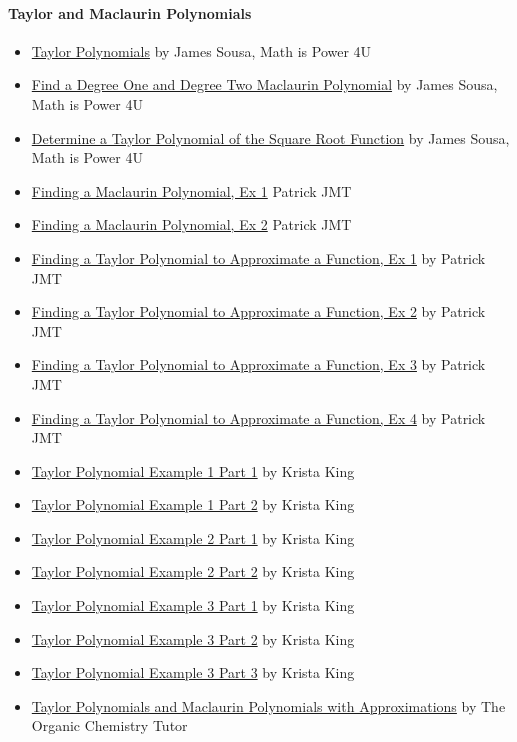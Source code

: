 \paragraph{Taylor and Maclaurin Polynomials}



\begin{itemize}
    \item \href{https://www.youtube.com/watch?v=lShzrGyiueg}{Taylor Polynomials} by James Sousa, Math is Power 4U
    \item \href{https://www.youtube.com/watch?v=SC6TsVsP90U}{Find a Degree One and Degree Two Maclaurin Polynomial} by James Sousa, Math is Power 4U
    \item \href{https://www.youtube.com/watch?v=39s-mgfuuno}{Determine a Taylor Polynomial of the Square Root Function} by James Sousa, Math is Power 4U
    \item \href{https://www.youtube.com/watch?v=6eNE38s9Fv0}{Finding a Maclaurin Polynomial, Ex 1} Patrick JMT
    \item \href{https://www.youtube.com/watch?v=tYl7tXKKkSw}{Finding a Maclaurin Polynomial, Ex 2} Patrick JMT
    \item \href{https://www.youtube.com/watch?v=WKvBJdl1qrM}{Finding a Taylor Polynomial to Approximate a Function, Ex 1} by Patrick JMT
    \item \href{https://www.youtube.com/watch?v=w_oDLT5VnBI}{Finding a Taylor Polynomial to Approximate a Function, Ex 2} by Patrick JMT
    \item \href{https://www.youtube.com/watch?v=UINFWG0ErSA}{Finding a Taylor Polynomial to Approximate a Function, Ex 3} by Patrick JMT
    \item \href{https://www.youtube.com/watch?v=em4YU8rUhco}{Finding a Taylor Polynomial to Approximate a Function, Ex 4} by Patrick JMT
    \item \href{https://www.youtube.com/watch?v=C1vcVMotnkg}{Taylor Polynomial Example 1 Part 1} by Krista King
    \item \href{https://www.youtube.com/watch?v=JMU-4o-Ffus}{Taylor Polynomial Example 1 Part 2} by Krista King
    \item \href{https://www.youtube.com/watch?v=h2EGCv0PyZ8}{Taylor Polynomial Example 2 Part 1} by Krista King
    \item \href{https://www.youtube.com/watch?v=Fw9u5h4MoJo}{Taylor Polynomial Example 2 Part 2} by Krista King
    \item \href{https://www.youtube.com/watch?v=kd5nuHkKsr4}{Taylor Polynomial Example 3 Part 1} by Krista King
    \item \href{https://www.youtube.com/watch?v=l5eqQFfMp-0}{Taylor Polynomial Example 3 Part 2} by Krista King
    \item \href{https://www.youtube.com/watch?v=NWl-dwL7_Do}{Taylor Polynomial Example 3 Part 3} by Krista King
    \item \href{https://www.youtube.com/watch?v=urPIxvNBXF0}{Taylor Polynomials and Maclaurin Polynomials with Approximations} by The Organic Chemistry Tutor
\end{itemize}

